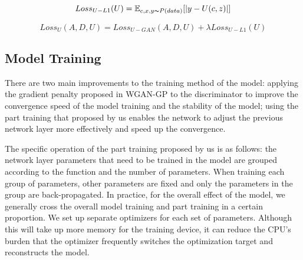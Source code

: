 \begin{equation}
    Loss_{U-L1}(U)=
    \mathbb{E}_{c,x,y\thicksim P(data)}[|y-U(c,z)|]
    \label{loss_u_l1}
\end{equation}

\begin{equation}
    Loss_{U}(A,D,U)=
    Loss_{U-GAN}(A,D,U)+
    \lambda Loss_{U-L1}(U)
    \label{loss_u}
\end{equation}

\subsection{Model Training}
There are two main improvements to the training method of the model:
    applying the gradient penalty proposed in WGAN-GP to the discriminator to improve the convergence speed of the model training and the stability of the model;
    using the part training that proposed by us enables the network to adjust the previous network layer more effectively and speed up the convergence.

The specific operation of the part training proposed by us is as follows: the network layer parameters that need to be trained in the model are grouped according to the function and the number of parameters.
When training each group of parameters, other parameters are fixed and only the parameters in the group are back-propagated.
In practice, for the overall effect of the model, we generally cross the overall model training and part training in a certain proportion.
We set up separate optimizers for each set of parameters.
Although this will take up more memory for the training device, it can reduce the CPU's burden that the optimizer frequently switches the optimization target and reconstructs the model.